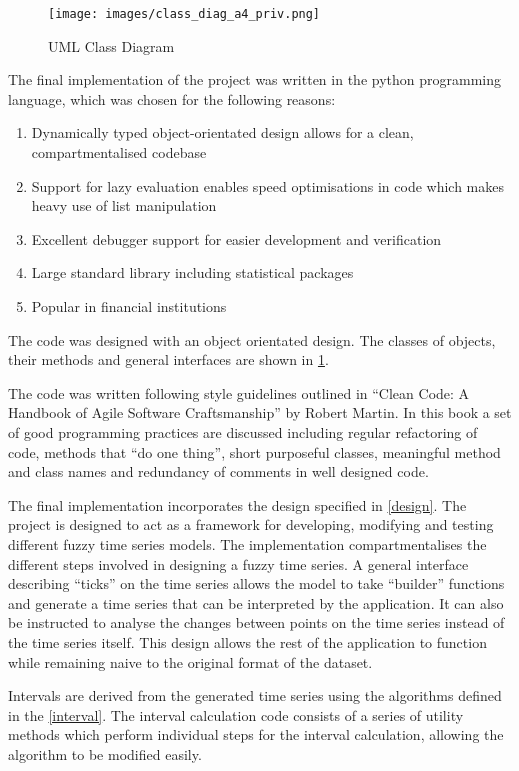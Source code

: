 \documentclass[12pt]{article}
\theoremstyle{definition}
\begin{document}
\begin{figure}[H]
    \centering
    \texttt{[image: images/class\_diag\_a4\_priv.png]}
    \caption{UML Class Diagram}
    \label{uml}
\end{figure}
\newpage

The final implementation of the project was written in the python programming language, which was chosen for the following reasons:

\begin{enumerate}[label=\roman*]
\label{python}
\item Dynamically typed object-orientated design allows for a clean, compartmentalised codebase
\item Support for lazy evaluation enables speed optimisations in code which makes heavy use of list manipulation
\item Excellent debugger support for easier development and verification
\item Large standard library including statistical packages
\item Popular in financial institutions
\end{enumerate}

The code was designed with an object orientated design. The classes of objects, their methods and general interfaces are shown in \cref{uml}. 

The code was written following style guidelines outlined in ``Clean Code: A Handbook of Agile Software Craftsmanship'' by Robert Martin. In this book a set of good programming practices are discussed including regular refactoring of code, methods that ``do one thing'', short purposeful classes, meaningful method and class names and redundancy of comments in well designed code.

The final implementation incorporates the design specified in \cref{design}. The project is designed to act as a framework for developing, modifying and testing different fuzzy time series models. The implementation compartmentalises the different steps involved in designing a fuzzy time series. A general interface describing ``ticks'' on the time series allows the model to take ``builder'' functions and generate a time series that can be interpreted by the application. It can also be instructed to analyse the changes between points on the time series instead of the time series itself. This design allows the rest of the application to function while remaining naive to the original format of the dataset.

Intervals are derived from the generated time series using the algorithms defined in the \cref{interval}. The interval calculation code consists of a series of utility methods which perform individual steps for the interval calculation, allowing the algorithm to be modified easily.
\end{document}
